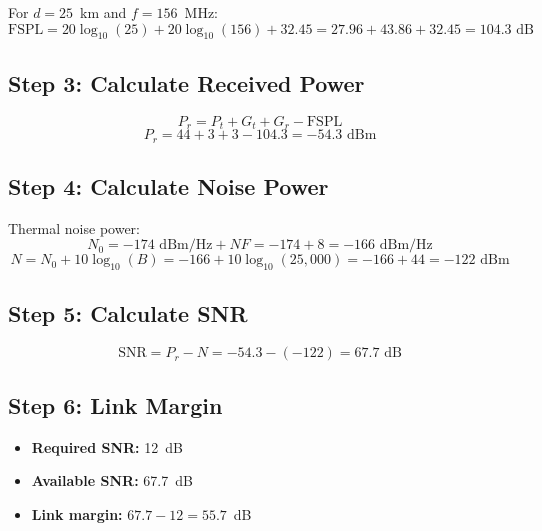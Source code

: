 For $d = 25$~km and $f = 156$~MHz:
\begin{equation}
\text{FSPL} = 20\log_{10}(25) + 20\log_{10}(156) + 32.45 = 27.96 + 43.86 + 32.45 = 104.3\text{ dB}
\end{equation}

\subsection*{Step 3: Calculate Received Power}

\begin{equation}
P_r = P_t + G_t + G_r - \text{FSPL}
\end{equation}
\begin{equation}
P_r = 44 + 3 + 3 - 104.3 = -54.3\text{ dBm}
\end{equation}

\subsection*{Step 4: Calculate Noise Power}

Thermal noise power:
\begin{equation}
N_0 = -174\text{ dBm/Hz} + NF = -174 + 8 = -166\text{ dBm/Hz}
\end{equation}
\begin{equation}
N = N_0 + 10\log_{10}(B) = -166 + 10\log_{10}(25{,}000) = -166 + 44 = -122\text{ dBm}
\end{equation}

\subsection*{Step 5: Calculate SNR}

\begin{equation}
\text{SNR} = P_r - N = -54.3 - (-122) = 67.7\text{ dB}
\end{equation}

\subsection*{Step 6: Link Margin}

\begin{itemize}
\item \textbf{Required SNR:} 12~dB
\item \textbf{Available SNR:} 67.7~dB
\item \textbf{Link margin:} $67.7 - 12 = 55.7$~dB
\end{itemize}

